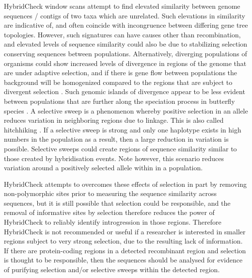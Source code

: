 HybridCheck window scans attempt to find elevated similarity between genome sequences / contigs of two taxa which are unrelated.
Such elevations in similarity are indicative of, and often coincide with incongruence between differing gene tree topologies.
However, such signatures can have causes other than recombination, and elevated levels of sequence similarity could also be due to stabilizing selection conserving sequences between populations.
Alternatively, diverging populations of organisms could show increased levels of divergence in regions of the genome that are under adaptive selection, and if there is gene flow between populations the background will be homogenized compared to the regions that are subject to divergent selection \parencite{Nadeau2012}.
Such genomic islands of divergence appear to be less evident between populations that are further along the speciation process in butterfly species \parencite{Nadeau2012}.
A selective sweep is a phenomenon whereby positive selection in an allele reduces variation in neighboring regions due to linkage.
This is also called hitchhiking \parencite{Hedrick1980}.
If a selective sweep is strong and only one haplotype exists in high numbers in the population as a result, then a large reduction in variation is possible.
Selective sweeps could create regions of sequence similarity similar to those created by hybridisation events.
Note however, this scenario reduces variation around a positively selected allele within in a population.

HybridCheck attempts to overcomes these effects of selection in part by removing non-polymorphic sites prior to measuring the sequence similarity across sequences, but it is still possible that selection could be responsible, and the removal of informative sites by selection therefore reduces the power of HybridCheck to reliably identify introgression in those regions.
Therefore HybridCheck is not recommended or useful if a researcher is interested in smaller regions subject to very strong selection, due to the resulting lack of information.
If there are protein-coding regions in a detected recombinant region and selection is thought to be responsible, then the sequences should be analysed for evidence of purifying selection and/or selective sweeps within the detected region.

